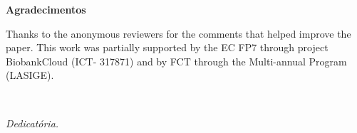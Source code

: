 \pagestyle{plain}

\vspace*{2cm}
\begin{center}
\Large \bf Agradecimentos
\end{center}
\vspace*{1cm} \setlength{\baselineskip}{0.6cm}


Thanks to the anonymous reviewers for the comments that helped improve the paper. This work was partially supported by the EC FP7 through project BiobankCloud (ICT- 317871) and by FCT through the Multi-annual Program (LASIGE).

\LIMPA
\LIMPA

~
\vfill

\begin{flushright}\textit{Dedicat\'{o}ria.}\end{flushright}

\LIMPA
